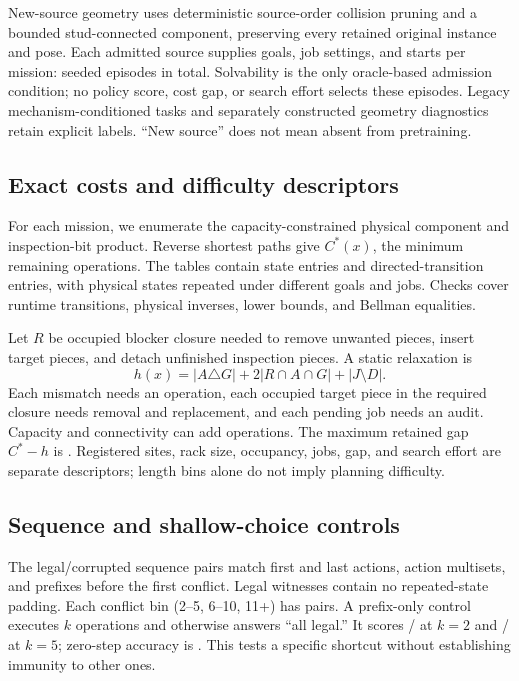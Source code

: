 \documentclass[10pt,twocolumn,letterpaper]{article}
\begin{document}
New-source geometry uses deterministic source-order collision pruning and
a bounded stud-connected component, preserving every retained original
instance and pose. Each admitted source supplies \GoalsPerSource{} goals,
\JobSettingsPerSource{} job settings, and \StartsPerMission{} starts per
mission: \NewSampledEpisodeCount{} seeded episodes in total. Solvability is
the only oracle-based admission condition; no policy score, cost gap, or
search effort selects these episodes. Legacy mechanism-conditioned tasks
and separately constructed geometry diagnostics retain explicit labels.
``New source'' does not mean absent from pretraining.

\begin{table}[t]
\centering\small
\caption{Fixed operation-length bins: D1 (1--8), D2 (9--16), D3
(17--24), D4 (25+). They are not cognitive-depth levels.}

\label{tab:tiers}
\end{table}

\subsection{Exact costs and difficulty descriptors}
For each mission, we enumerate the capacity-constrained physical
component and inspection-bit product. Reverse shortest paths give
$C^*(x)$, the minimum remaining operations. The \OracleCount{} tables
contain \ProductCount{} state entries and \EdgeCount{} directed-transition
entries, with physical states repeated under different goals and jobs.
Checks cover runtime transitions, physical inverses, lower bounds, and
Bellman equalities.

Let $R$ be occupied blocker closure needed to remove unwanted pieces,
insert target pieces, and detach unfinished inspection pieces. A static
relaxation is
\begin{equation}
 h(x)=|A\triangle G|+2|R\cap A\cap G|+|J\setminus D|.
\end{equation}
Each mismatch needs an operation, each occupied target piece in the
required closure needs removal and replacement, and each pending job
needs an audit. Capacity and connectivity can add operations. The maximum
retained gap $C^*-h$ is \MaxGap{}. Registered sites, rack size, occupancy,
jobs, gap, and search effort are separate descriptors; length bins alone
do not imply planning difficulty.

\subsection{Sequence and shallow-choice controls}
The \SequencePairCount{} legal/corrupted sequence pairs match first and last actions,
action multisets, and prefixes before the first conflict. Legal witnesses
contain no repeated-state padding. Each conflict bin (2--5, 6--10, 11+)
has \SequencePairsPerBin{} pairs. A prefix-only control executes $k$ operations and otherwise
answers ``all legal.'' It scores \PrefixTwoCorrect{}/\PrefixTwoTotal{} at $k=2$
and \PrefixFiveCorrect{}/\PrefixFiveTotal{} at $k=5$;
zero-step accuracy is \PrefixZeroAccuracy{}. This tests a specific shortcut without
establishing immunity to other ones.
\end{document}
